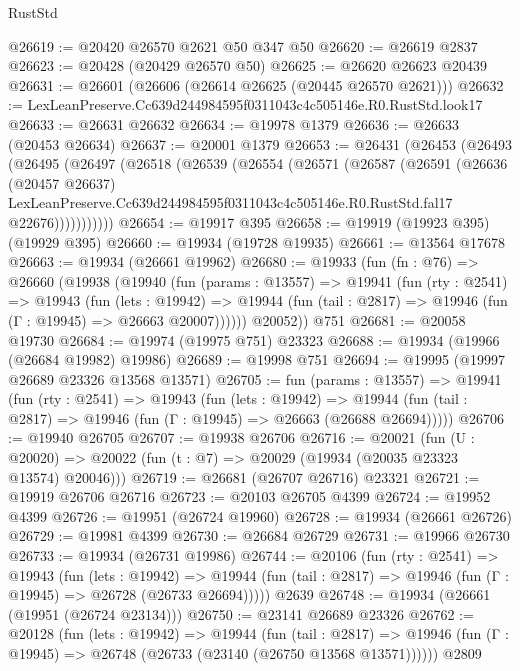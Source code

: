 \begin{lexlean}{RustStd}
\begin{coremodule}
@26619 := @20420 @26570 @2621 @50 @347 @50
@26620 := @26619 @2837
@26623 := @20428 (@20429 @26570 @50)
@26625 := @26620 @26623 @20439
@26631 := @26601 (@26606 (@26614 @26625 (@20445 @26570 @2621)))
@26632 := LexLeanPreserve.Cc639d244984595f0311043c4c505146e.R0.RustStd.look17
@26633 := @26631 @26632
@26634 := @19978 @1379
@26636 := @26633 (@20453 @26634)
@26637 := @20001 @1379
@26653 := @26431
    (@26453
      (@26493
        (@26495
          (@26497
            (@26518
              (@26539
                (@26554
                  (@26571
                    (@26587
                      (@26591
                        (@26636
                          (@20457 @26637)
                          LexLeanPreserve.Cc639d244984595f0311043c4c505146e.R0.RustStd.fal17
                          @22676)))))))))))
@26654 := @19917 @395
@26658 := @19919 (@19923 @395) (@19929 @395)
@26660 := @19934 (@19728 @19935)
@26661 := @13564 @17678
@26663 := @19934 (@26661 @19962)
@26680 := @19933
    (fun (fn : @76) =>
    @26660
      (@19938
        (@19940
          (fun (params : @13557) =>
          @19941
            (fun (rty : @2541) =>
            @19943
              (fun (lets : @19942) =>
              @19944 (fun (tail : @2817) => @19946 (fun (Γ : @19945) => @26663 @20007))))))
        @20052))
    @751
@26681 := @20058 @19730
@26684 := @19974 (@19975 @751) @23323
@26688 := @19934 (@19966 (@26684 @19982) @19986)
@26689 := @19998 @751
@26694 := @19995 (@19997 @26689 @23326 @13568 @13571)
@26705 := fun (params : @13557) =>
  @19941
    (fun (rty : @2541) =>
    @19943
      (fun (lets : @19942) =>
      @19944 (fun (tail : @2817) => @19946 (fun (Γ : @19945) => @26663 (@26688 @26694)))))
@26706 := @19940 @26705
@26707 := @19938 @26706
@26716 := @20021
    (fun (U : @20020) => @20022 (fun (t : @7) => @20029 (@19934 (@20035 @23323 @13574) @20046)))
@26719 := @26681 (@26707 @26716) @23321
@26721 := @19919 @26706 @26716
@26723 := @20103 @26705 @4399
@26724 := @19952 @4399
@26726 := @19951 (@26724 @19960)
@26728 := @19934 (@26661 @26726)
@26729 := @19981 @4399
@26730 := @26684 @26729
@26731 := @19966 @26730
@26733 := @19934 (@26731 @19986)
@26744 := @20106
    (fun (rty : @2541) =>
    @19943
      (fun (lets : @19942) =>
      @19944 (fun (tail : @2817) => @19946 (fun (Γ : @19945) => @26728 (@26733 @26694)))))
    @2639
@26748 := @19934 (@26661 (@19951 (@26724 @23134)))
@26750 := @23141 @26689 @23326
@26762 := @20128
    (fun (lets : @19942) =>
    @19944
      (fun (tail : @2817) =>
      @19946 (fun (Γ : @19945) => @26748 (@26733 (@23140 (@26750 @13568 @13571))))))
    @2809

\end{coremodule}
\end{lexlean}
